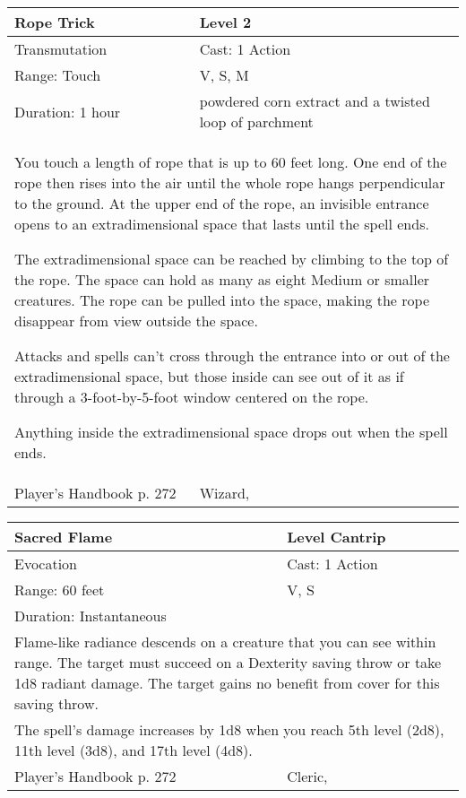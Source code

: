 \documentclass[11pt]{report}
\begin{document}
\begin{table}[H]
	\begin{tabular}{||p{6cm}|p{6cm}||}
		\hline\hline
		\bf{Rope Trick} & Level 2\\ \hline
		Transmutation & Cast: 1 Action\\ \hline
		Range: Touch & V, S, M\\ \hline
		Duration: 1 hour & powdered corn extract and a twisted loop of parchment\\ \hline
		\multicolumn{2}{||p{12cm}||}{You touch a length of rope that is up to 60 feet long. One end of the rope then rises into the air until the whole rope hangs perpendicular to the ground. At the upper end of the rope, an invisible entrance opens to an extradimensional space that lasts until the spell ends.

The extradimensional space can be reached by climbing to the top of the rope. The space can hold as many as eight Medium or smaller creatures. The rope can be pulled into the space, making the rope disappear from view outside the space.

Attacks and spells can’t cross through the entrance into or out of the extradimensional space, but those inside can see out of it as if through a 3-foot-by-5-foot window centered on the rope.

Anything inside the extradimensional space drops out when the spell ends.}\\ \hline
Player's Handbook p. 272 & Wizard, \\ \hline\hline
	\end{tabular}
\end{table}

\begin{table}[H]
	\begin{tabular}{||p{6cm}|p{6cm}||}
		\hline\hline
		\bf{Sacred Flame} & Level Cantrip\\ \hline
		Evocation & Cast: 1 Action\\ \hline
		Range: 60 feet & V, S\\ \hline
		Duration: Instantaneous & \\ \hline
		\multicolumn{2}{||p{12cm}||}{Flame-like radiance descends on a creature that you can see within range. The target must succeed on a Dexterity saving throw or take 1d8 radiant damage. The target gains no benefit from cover for this saving throw.}\\ \hline
		\multicolumn{2}{||p{12cm}||}{The spell’s damage increases by 1d8 when you reach 5th level (2d8), 11th level (3d8), and 17th level (4d8).}\\ \hline
Player's Handbook p. 272 & Cleric, \\ \hline\hline
	\end{tabular}
\end{table}
\end{document}
